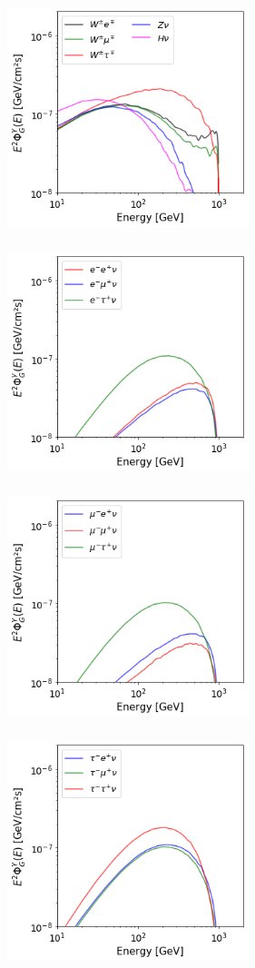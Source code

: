 \documentclass[a4paper,11pt]{article}
\begin{document}
\begin{figure}[htb]
\begin{center}
\includegraphics[height=7cm,width=7cm,angle=0]{Draft/Figures/bilinear-photon.png}
\includegraphics[height=7cm,width=7cm,angle=0]{Draft/Figures/trilinear-photon-147.png} \\
\includegraphics[height=7cm,width=7cm,angle=0]{Draft/Figures/trilinear-photon-256.png}
\includegraphics[height=7cm,width=7cm,angle=0]{Draft/Figures/trilinear-photon-389.png}

\end{center}
\end{figure}
\end{document}

